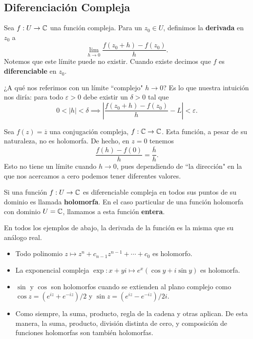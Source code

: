 \subsection{Diferenciaci\'on Compleja}

Sea $f: U \to \mathbb C$ una funci\'on compleja. Para un $z_0 \in U$, definimos la \textbf{derivada}
en $z_0$ a
\[
  \lim_{h \to 0} \frac{f(z_0 + h) - f(z_0)}{h}.
\] 
Notemos que este l\'imite puede no existir. Cuando existe decimos que $f$ es \textbf{diferenciable}
en $z_0$.

¿A qu\'e nos referimos con un l\'imite ``complejo" $h \to 0$?
Es lo que nuestra intuici\'on nos dir\'ia:
para todo $\varepsilon > 0$ debe existir un $\delta > 0$ tal que
\[
  0 < |h| < \delta \implies \left|\frac{f(z_0 + h) - f(z_0)}{h} - L\right| < \varepsilon.
\]

\begin{example}
  Sea $f(z) = \overline{z}$ una conjugaci\'on compleja, $f: \mathbb C \to \mathbb C$. Esta funci\'on, a pesar
  de su naturaleza, no es holomorfa. De hecho, en $z = 0$ tenemos
  \[
    \frac{f(h) - f(0)}{h} = \frac{\overline{h}}{h}.
  \]
  Esto no tiene un l\'imite cuando $h \to 0$, pues dependiendo de ``la direcci\'on" en la que
  nos acercamos a cero podemos tener diferentes valores.
\end{example}

Si una funci\'on $f: U \to \mathbb C$ es diferenciable compleja en todos sus puntos de su dominio
es llamada \textbf{holomorfa}. En el caso particular de una funci\'on holomorfa con dominio
$U = \mathbb C$, llamamos a esta funci\'on \textbf{entera}.

\begin{example}
  En todos los ejemplos de abajo, la derivada de la funci\'on es la misma que su an\'alogo real.
  \begin{itemize}
    \item Todo polinomio $z \mapsto z^n + c_{n - 1} z^{n - 1} + \cdots + c_0$ es holomorfo.
    \item La exponencial compleja $\exp: x + yi \mapsto e^x (\cos y + i \sin y)$ es holomorfa.
    \item $\sin$ y $\cos$ son holomorfos cuando se extienden al plano complejo como
    $\cos z = (e^{iz} + e^{-iz}) / 2$ y $\sin z = (e^{iz} - e^{-iz}) / 2i$.
    \item Como siempre, la suma, producto, regla de la cadena y otras aplican. De esta manera, la suma,
    producto, divisi\'on distinta de cero, y composici\'on de funciones holomorfas son tambi\'en
    holomorfas.
  \end{itemize}
\end{example}